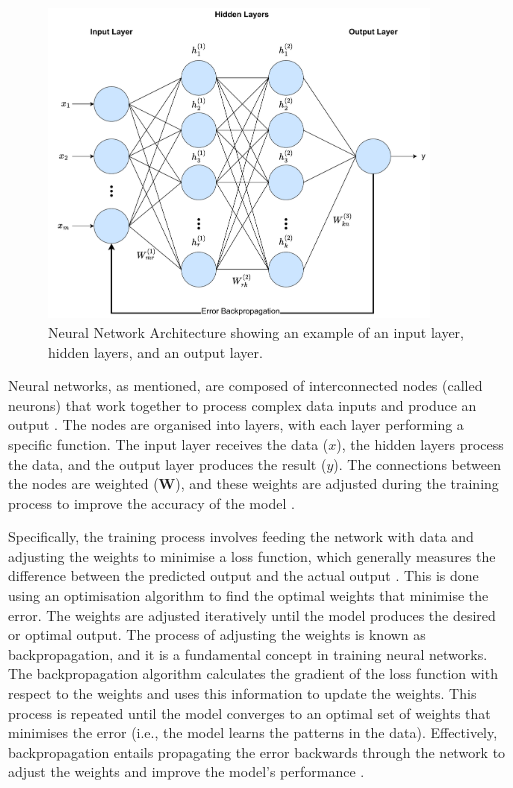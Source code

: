 \begin{figure}[h]
    \centering
    \includegraphics[width=0.9\textwidth]{Figures/flowchart of model process-Neural Nets-2.pdf} %
    \caption{Neural Network Architecture showing an example of an input layer, hidden layers, and an output layer.}
    \label{fig:neural_network}
  \end{figure}

Neural networks, as mentioned, are composed of interconnected nodes (called neurons) that work together to process complex data inputs and produce an output \cite{gurney2018introduction}. The nodes are organised into layers, with each layer performing a specific function. The input layer receives the data ($x$), the hidden layers process the data, and the output layer produces the result ($y$). The connections between the nodes are weighted ($\mathbf{W}$), and these weights are adjusted during the training process to improve the accuracy of the model \cite{abdi1999neural}. 

Specifically, the training process involves feeding the network with data and adjusting the weights to minimise a loss function, which generally measures the difference between the predicted output and the actual output \cite{abdi1999neural}. This is done using an optimisation algorithm to find the optimal weights that minimise the error. The weights are adjusted iteratively until the model produces the desired or optimal output. The process of adjusting the weights is known as backpropagation, and it is a fundamental concept in training neural networks. The backpropagation algorithm calculates the gradient of the loss function with respect to the weights and uses this information to update the weights. This process is repeated until the model converges to an optimal set of weights that minimises the error (i.e., the model learns the patterns in the data). Effectively, backpropagation entails propagating the error backwards through the network to adjust the weights and improve the model's performance \cite{abdi1999neural}. 

